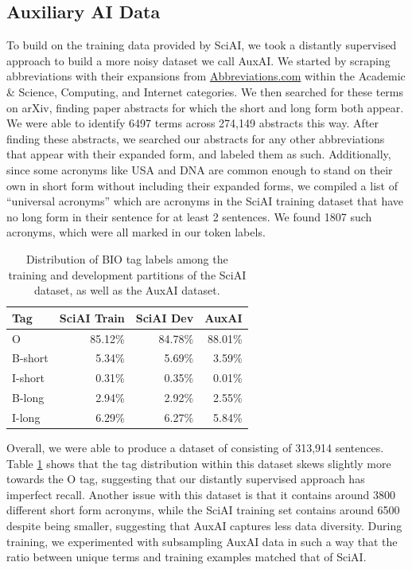 \documentclass[letterpaper]{article} %
\begin{document}
\subsection{Auxiliary AI Data}
To build on the training data provided by SciAI, we took a distantly supervised approach to build a more noisy dataset we call AuxAI. We started by scraping abbreviations with their expansions from \url{Abbreviations.com} within the Academic \& Science, Computing, and Internet categories. We then searched for these terms on arXiv, finding paper abstracts for which the short and long form both appear. We were able to identify 6497 terms across 274,149 abstracts this way. After finding these abstracts, we searched our abstracts for any other abbreviations that appear with their expanded form, and labeled them as such. Additionally, since some acronyms like USA and DNA are common enough to stand on their own in short form without including their expanded forms, we compiled a list of ``universal acronyms'' which are acronyms in the SciAI training dataset that have no long form in their sentence for at least 2 sentences. We found 1807 such acronyms, which were all marked in our token labels.

\begin{table}[ht]
\centering
\begin{tabular}{@{}lrrr@{}}
\toprule
\textbf{Tag} & \textbf{SciAI Train} & \textbf{SciAI Dev} & \textbf{AuxAI} \\ \midrule
O & 85.12\% & 84.78\% & 88.01\% \\
B-short & 5.34\% & 5.69\% & 3.59\% \\
I-short & 0.31\% & 0.35\% & 0.01\% \\
B-long & 2.94\% & 2.92\% & 2.55\% \\
I-long & 6.29\% & 6.27\% & 5.84\% \\ \bottomrule
\end{tabular}
\caption{Distribution of BIO tag labels among the training and development partitions of the SciAI dataset, as well as the AuxAI dataset.}
\label{tab:auxai-dist}
\end{table}

Overall, we were able to produce a dataset of consisting of 313,914 sentences. Table \ref{tab:auxai-dist} shows that the tag distribution within this dataset skews slightly more towards the O tag, suggesting that our distantly supervised approach has imperfect recall. Another issue with this dataset is that it contains around 3800 different short form acronyms, while the SciAI training set contains around 6500 despite being smaller, suggesting that AuxAI captures less data diversity. During training, we experimented with subsampling AuxAI data in such a way that the ratio between unique terms and training examples matched that of SciAI.
\end{document}
